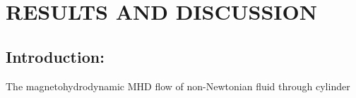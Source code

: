 \chapter{RESULTS AND DISCUSSION}
\section{Introduction:}
The magnetohydrodynamic MHD  flow  of  non-Newtonian  fluid  through  cylinder
